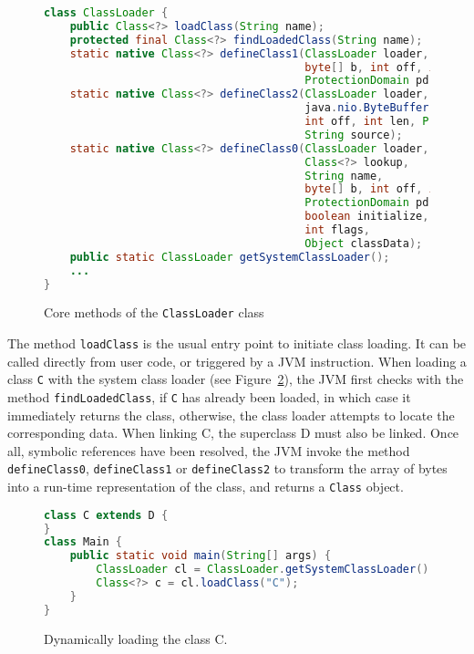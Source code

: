 \begin{figure}[ht]
    \centering
\begin{lstlisting}[language=Java]
class ClassLoader {
    public Class<?> loadClass(String name);
    protected final Class<?> findLoadedClass(String name);
    static native Class<?> defineClass1(ClassLoader loader, String name, 
                                        byte[] b, int off, int len,
                                        ProtectionDomain pd, String source);
    static native Class<?> defineClass2(ClassLoader loader, String name, 
                                        java.nio.ByteBuffer b,
                                        int off, int len, ProtectionDomain pd,
                                        String source);
    static native Class<?> defineClass0(ClassLoader loader,
                                        Class<?> lookup,
                                        String name,
                                        byte[] b, int off, int len,
                                        ProtectionDomain pd,
                                        boolean initialize,
                                        int flags,
                                        Object classData);
    public static ClassLoader getSystemClassLoader();
    ...
}
\end{lstlisting}
    \caption{Core methods of the \texttt{ClassLoader} class}
    \label{fig:classloader}
\end{figure}


The method \verb|loadClass| is the usual entry point to initiate class loading. It can be called directly from user code, or triggered by a JVM instruction.
When loading a class \verb|C| with the system class loader (see Figure~\ref{fig:class_C}), the JVM first checks with the method \verb|findLoadedClass|, if \verb|C| has already been loaded, in which case it immediately returns the class, otherwise, the class loader attempts to locate the corresponding data. When linking C, the superclass D must also be linked. Once all, symbolic references have been resolved, the JVM invoke the method \verb|defineClass0|, \verb|defineClass1| or \verb|defineClass2| to transform the array of bytes into a run-time representation of the class, and returns a \verb|Class| object.

\begin{figure}[ht]
    \centering
\begin{lstlisting}[language=Java]
class C extends D {
}
class Main {
    public static void main(String[] args) {
        ClassLoader cl = ClassLoader.getSystemClassLoader();
        Class<?> c = cl.loadClass("C");
    }
}
\end{lstlisting}
    \caption{Dynamically loading the class C.}
    \label{fig:class_C}
\end{figure}


